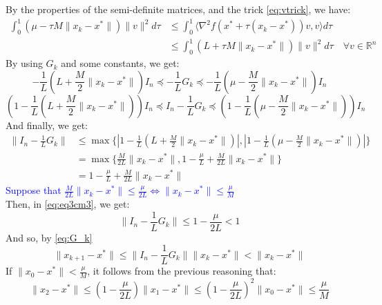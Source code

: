 \documentclass[12pt, openany]{report}
\newcommand{\R}{\mathbb{R}}
\theoremstyle{definition}
\begin{document}
By the properties of the semi-definite matrices, and the trick \eqref{eq:vtrick}, we have:
\begin{equation}
	\begin{aligned}
		\int_{0}^{1} (\mu - \tau M \|x_k -x^*\|) \|v\|^2 d\tau &\leq \int_{0}^{1} \langle \nabla^2f(x^*+\tau(x_k-x^*)) v,v \rangle d\tau\\ 
		&\leq \int_{0}^{1} (L + \tau M \|x_k -x^*\|) \|v\|^2 d\tau \quad \forall v \in \R^n
	\end{aligned}
\end{equation}
By using $G_k$ and some constants, we get:
\begin{equation}
	-\frac{1}{L}(L+\frac{M}{2}\|x_k -x^*\|)I_n \preceq - \frac{1}{L} G_k \preceq -\frac{1}{L}(\mu - \frac{M}{2}\|x_k -x^*\|)I_n
\end{equation}
\begin{equation}
	\left(1-\frac{1}{L}(L+\frac{M}{2}\|x_k -x^*\|)\right)I_n \preceq I_n - \frac{1}{L}G_k \preceq \left(1-\frac{1}{L}(\mu - \frac{M}{2}\|x_k -x^*\|)\right)I_n
\end{equation}
And finally, we get:
\begin{equation}\label{eq:eq3cm3}
	\begin{aligned}
		\|I_n - \frac{1}{L}G_k\| &\leq \max\{|1-\frac{1}{L}(L + \frac{M}{2}\|x_k -x^*\|)|,|1-\frac{1}{L}(\mu - \frac{M}{2}\|x_k -x^*\|)|\}\\
		&= \max\{\frac{M}{2L}\|x_k -x^*\|, 1-\frac{\mu}{L}+\frac{M}{2L}\|x_k -x^*\|\}\\
		&= 1-\frac{\mu}{L}+\frac{M}{2L}\|x_k -x^*\|
	\end{aligned}
\end{equation}
\textcolor{blue}{Suppose that $\frac{M}{2L} \|x_k -x^*\| \leq \frac{\mu}{2L} \Longleftrightarrow \|x_k -x^*\| \leq \frac{\mu}{M}$}\\
Then, in \eqref{eq:eq3cm3}, we get:
\begin{equation}
	\|I_n - \frac{1}{L}G_k\| \leq 1-\frac{\mu}{2L} < 1
\end{equation}
And so, by \eqref{eq:G_k}
\begin{equation}\label{eq:bound_by_G_k}
	\|x_{k+1} - x^*\| \leq \|I_n - \frac{1}{L}G_k\| \|x_k -x^*\| < \|x_k -x^*\|
\end{equation}
If $\|x_0 - x^* \|< \frac{\mu}{M}$, it follows from the previous reasoning that:
\begin{equation}
	\|x_2 - x^*\| \leq  (1-\frac{\mu}{2L}) \|x_1-x^*\| \leq (1-\frac{\mu}{2L})^2 \|x_0-x^*\|\leq \frac{\mu}{M}
\end{equation} 
\end{document}
